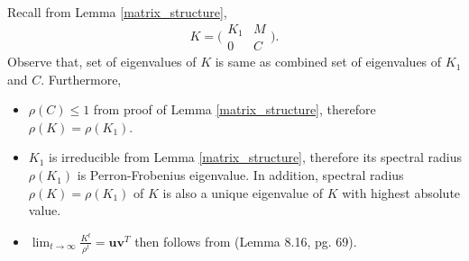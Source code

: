 \documentclass{article}
\theoremstyle{definition}
\begin{document}
 
 





Recall from Lemma \ref{matrix_structure}, \[K=\big(\begin{smallmatrix} K_1 & M \\ 0 & C\end{smallmatrix}\big).\]
Observe that, set of eigenvalues of $K$ is same as combined set of eigenvalues of $K_1$ and $C$. Furthermore,
\begin{itemize}
    \item 
     $\rho(C) \leq 1$ from proof of Lemma \ref{matrix_structure},  therefore $\rho(K)=\rho(K_1)$.
    \item
    $K_1$ is irreducible from Lemma \ref{matrix_structure}, therefore its spectral radius $\rho(K_1)$ is Perron-Frobenius eigenvalue. In addition, spectral radius $\rho(K) = \rho(K_1)$ of $K$ is also a unique eigenvalue of $K$ with highest absolute value.
    \item
    $\lim_{t \to \infty} \frac{K^t}{\rho^t} = \bm{u}\bm{v}^T$ then follows from \cite{matrix_analysis_notes} (Lemma 8.16, pg. 69).
\end{itemize}




\end{document}
